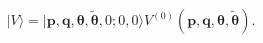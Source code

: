 \begin{equation}
 |V\rangle=|\boldsymbol p,\boldsymbol q,
\boldsymbol\theta,\boldsymbol{\tilde\theta},0;0,0\rangle 
V^{(0)}(\boldsymbol p,\boldsymbol q,
\boldsymbol\theta,\boldsymbol{\tilde\theta}).
\end{equation}

